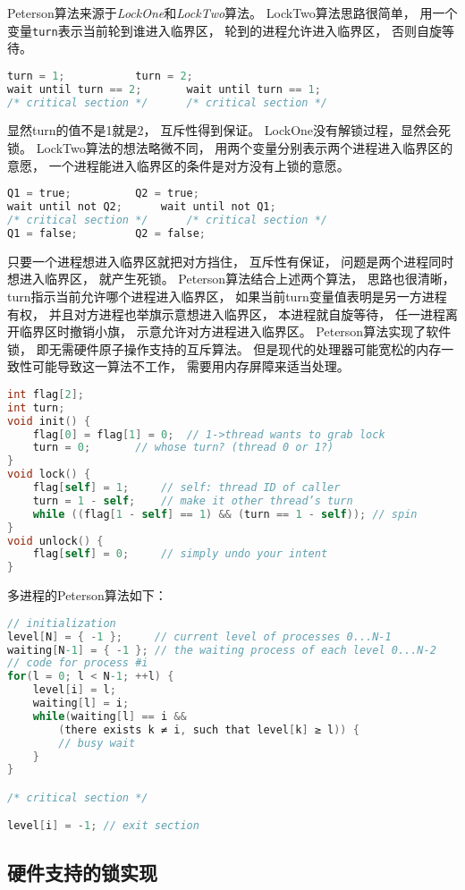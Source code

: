 Peterson算法来源于{\em LockOne}和{\em LockTwo}算法。
LockTwo算法思路很简单，
用一个变量\verb|turn|表示当前轮到谁进入临界区，
轮到的进程允许进入临界区，
否则自旋等待。
\begin{lstlisting}[language=C]
turn = 1;			turn = 2;
wait until turn == 2;		wait until turn == 1;
/* critical section */		/* critical section */
  \end{lstlisting}
显然turn的值不是1就是2，
互斥性得到保证。
LockOne没有解锁过程，显然会死锁。
LockTwo算法的想法略微不同，
用两个变量分别表示两个进程进入临界区的意愿，
一个进程能进入临界区的条件是对方没有上锁的意愿。
\begin{lstlisting}[language=C]
Q1 = true;			Q2 = true;
wait until not Q2;		wait until not Q1;
/* critical section */		/* critical section */
Q1 = false;			Q2 = false;
\end{lstlisting}
只要一个进程想进入临界区就把对方挡住，
互斥性有保证，
问题是两个进程同时想进入临界区，
就产生死锁。
Peterson算法结合上述两个算法，
思路也很清晰，
turn指示当前允许哪个进程进入临界区，
如果当前turn变量值表明是另一方进程有权，
并且对方进程也举旗示意想进入临界区，
本进程就自旋等待，
任一进程离开临界区时撤销小旗，
示意允许对方进程进入临界区。
Peterson算法实现了软件锁，
即无需硬件原子操作支持的互斥算法。
但是现代的处理器可能宽松的内存一致性可能导致这一算法不工作，
需要用内存屏障来适当处理。
\begin{lstlisting}[language=C]
int flag[2];
int turn;
void init() {
	flag[0] = flag[1] = 0;	// 1->thread wants to grab lock
	turn = 0;		// whose turn? (thread 0 or 1?)
}
void lock() {
	flag[self] = 1;		// self: thread ID of caller
	turn = 1 - self;	// make it other thread’s turn
	while ((flag[1 - self] == 1) && (turn == 1 - self)); // spin
}
void unlock() {
	flag[self] = 0;		// simply undo your intent
}
\end{lstlisting}

多进程的Peterson算法如下：
\begin{lstlisting}[language=C]
// initialization
level[N] = { -1 };     // current level of processes 0...N-1
waiting[N-1] = { -1 }; // the waiting process of each level 0...N-2
// code for process #i
for(l = 0; l < N-1; ++l) {
	level[i] = l;
	waiting[l] = i;
	while(waiting[l] == i &&
		(there exists k ≠ i, such that level[k] ≥ l)) {
		// busy wait
	}
}

/* critical section */

level[i] = -1; // exit section
\end{lstlisting}

\subsection{硬件支持的锁实现}


